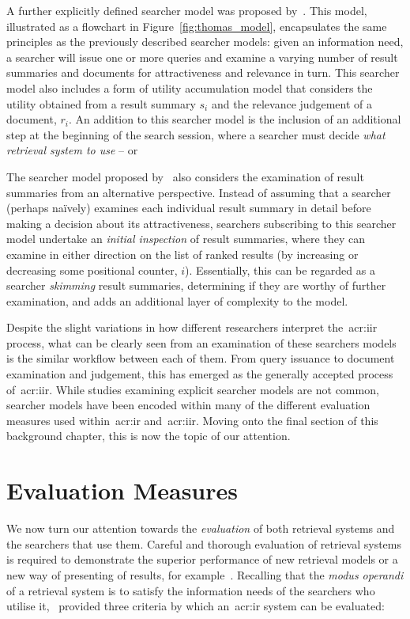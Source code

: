A further explicitly defined searcher model was proposed by~\cite{thomas2014modelling_behaviour}. This model, illustrated as a flowchart in Figure~\ref{fig:thomas_model}, encapsulates the same principles as the previously described searcher models: given an information need, a searcher will issue one or more queries and examine a varying number of result summaries and documents for attractiveness and relevance in turn. This searcher model also includes a form of utility accumulation model that considers the utility obtained from a result summary $s_i$ and the relevance judgement of a document, $r_i$. An addition to this searcher model is the inclusion of an additional step at the beginning of the search session, where a searcher must decide \emph{what retrieval system to use} -- or 


The searcher model proposed by~\cite{thomas2014modelling_behaviour} also considers the examination of result summaries from an alternative perspective. Instead of assuming that a searcher (perhaps na\"{i}vely) examines each individual result summary in detail before making a decision about its attractiveness, searchers subscribing to this searcher model undertake an \emph{initial inspection} of result summaries, where they can examine in either direction on the list of ranked results (by increasing or decreasing some positional counter, $i$). Essentially, this can be regarded as a searcher \emph{skimming} result summaries, determining if they are worthy of further examination, and adds an additional layer of complexity to the model.

Despite the slight variations in how different researchers interpret the~\gls{acr:iir} process, what can be clearly seen from an examination of these searchers models is the similar workflow between each of them. From query issuance to document examination and judgement, this has emerged as the generally accepted process of~\gls{acr:iir}. While studies examining explicit searcher models are not common, searcher models have been encoded within many of the different evaluation measures used within~\gls{acr:ir} and~\gls{acr:iir}. Moving onto the final section of this background chapter, this is now the topic of our attention.

\section{Evaluation Measures}\label{sec:ir_background:evaluation}
We now turn our attention towards the \emph{evaluation} of both retrieval systems and the searchers that use them. Careful and thorough evaluation of retrieval systems is required to demonstrate the superior performance of new retrieval models or a new way of presenting of results, for example~\citep{manning2008ir}. Recalling that the \emph{modus operandi} of a retrieval system is to satisfy the information needs of the searchers who utilise it,~\cite{lancaster1968information} provided three criteria by which an~\gls{acr:ir} system can be evaluated:

